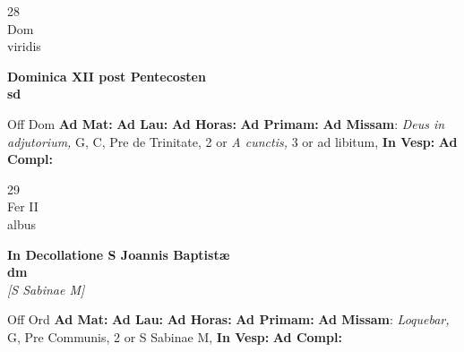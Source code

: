 \documentclass[10pt, openany]{book}
\begin{document}
    \begin{center}
        \begin{minipage}{3.5in}
            \vspace{2em}
            \begin{minipage}{0.5in}
                {\Huge 28} \\
                {\normalsize Dom} \\
                {\normalsize viridis}
            \end{minipage}
            \begin{minipage}{3.0in}
                \textbf{ \large Dominica XII post Pentecosten \\
                \textnormal{\normalsize sd}} \\ 
            \end{minipage}
            \begin{justify}Off Dom
                \textbf{Ad Mat: }
                \textbf{Ad Lau: }
                \textbf{Ad Horas: }
                \textbf{Ad Primam: }\textbf{Ad Missam}: \textit{Deus in adjutorium,} G, C, Pre de Trinitate, 2 or \textit{A cunctis,} 3 or ad libitum,  
                \textbf{In Vesp: }
                \textbf{Ad Compl: }
            \end{justify}
        \end{minipage}
    \end{center}

    \begin{center}
        \begin{minipage}{3.5in}
            \vspace{2em}
            \begin{minipage}{0.5in}
                {\Huge 29} \\
                {\normalsize Fer II} \\
                {\normalsize albus}
            \end{minipage}
            \begin{minipage}{3.0in}
                \textbf{ \large In Decollatione S Joannis Baptistæ \\
                \textnormal{\normalsize dm}} \\ \textit{[S Sabinae M]} \\ 
            \end{minipage}
            \begin{justify}Off Ord
                \textbf{Ad Mat: }
                \textbf{Ad Lau: }
                \textbf{Ad Horas: }
                \textbf{Ad Primam: }\textbf{Ad Missam}: \textit{Loquebar,} G, Pre Communis, 2 or S Sabinae M,  
                \textbf{In Vesp: }
                \textbf{Ad Compl: }
            \end{justify}
        \end{minipage}
    \end{center}
\end{document}
